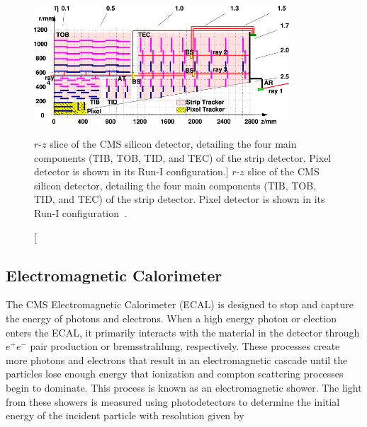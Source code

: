\begin{figure}[htbp]
	\centering
	\includegraphics[width=0.85\textwidth]{figs/03_experiment/las.png}
	\caption
	[$r$-$z$ slice of the CMS silicon detector, detailing the four main components (TIB, TOB, TID, and TEC) of the strip detector. Pixel detector is shown in its Run-I configuration.]
	{$r$-$z$ slice of the CMS silicon detector, detailing the four main components (TIB, TOB, TID, and TEC) of the strip detector. Pixel detector is shown in its Run-I configuration~\cite{Chatrchyan:1211825}.}
	\label{fig:strip}
\end{figure}

\subsection{Electromagnetic Calorimeter} \label{sec:CMS_ECAL}
The CMS Electromagnetic Calorimeter (ECAL) is designed to stop and capture the energy of photons and electrons. When a high energy photon or election enters the ECAL, it primarily interacts with the material in the detector through $e^+e^-$ pair production or bremsstrahlung, respectively. These processes create more photons and electrons that result in an electromagnetic cascade until the particles lose enough energy that ionization and compton scattering processes begin to dominate. This process is known as an electromagnetic shower. The light from these showers is measured using photodetectors to determine the initial energy of the incident particle with resolution given by

